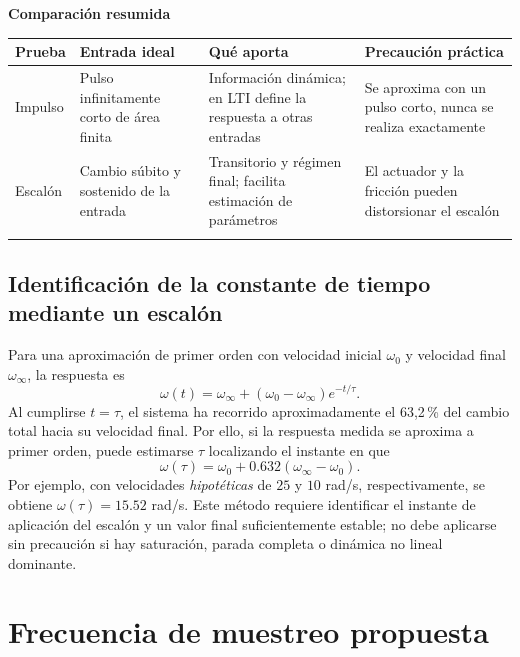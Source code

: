 \documentclass[9pt,a4paper,twocolumn]{extarticle}
\renewcommand{\arraystretch}{1.08}
\begin{document}
\textbf{Comparación resumida}

\begin{center}\begingroup\setlength{\tabcolsep}{2pt}\renewcommand{\arraystretch}{1.15}\scriptsize
\begin{tabularx}{\columnwidth}{@{}YYYY@{}}
\toprule
\textbf{Prueba} & \textbf{Entrada ideal} & \textbf{Qué aporta} & \textbf{Precaución práctica}\\
\midrule
Impulso & Pulso infinitamente corto de área finita & Información dinámica; en LTI define la respuesta a otras entradas & Se aproxima con un pulso corto, nunca se realiza exactamente\\
\addlinespace[2pt]
Escalón & Cambio súbito y sostenido de la entrada & Transitorio y régimen final; facilita estimación de parámetros & El actuador y la fricción pueden distorsionar el escalón\\
\addlinespace[2pt]
\bottomrule
\end{tabularx}\endgroup\end{center}

\subsection{Identificación de la constante de tiempo mediante un escalón}
Para una aproximación de primer orden con velocidad inicial $\omega_0$ y
velocidad final $\omega_\infty$, la respuesta es
\begin{equation}
\omega(t)=\omega_\infty+(\omega_0-\omega_\infty)e^{-t/\tau}.
\end{equation}
Al cumplirse $t=\tau$, el sistema ha recorrido aproximadamente el
63,2\,\% del cambio total hacia su velocidad final. Por ello, si la
respuesta medida se aproxima a primer orden, puede estimarse $\tau$
localizando el instante en que
\begin{equation}
\omega(\tau)=\omega_0+0.632(\omega_\infty-\omega_0).
\end{equation}
Por ejemplo, con velocidades \emph{hipotéticas} de $25$ y $10$ rad/s,
respectivamente, se obtiene $\omega(\tau)=15.52$ rad/s. Este método
requiere identificar el instante de aplicación del escalón y un valor
final suficientemente estable; no debe aplicarse sin precaución si hay
saturación, parada completa o dinámica no lineal dominante.

\section{Frecuencia de muestreo
propuesta}\label{frecuencia-de-muestreo-propuesta}
\end{document}
